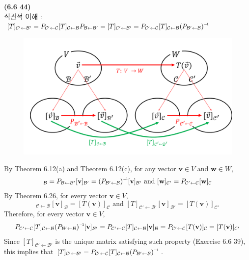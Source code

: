 \textbf{(6.6 44)} \\
직관적 이해 : $[T]_{ \mathcal{C}' \leftarrow \mathcal{B}' } = P_{ \mathcal{C}' \leftarrow \mathcal{C} }[T]_{ \mathcal{C} \leftarrow \mathcal{B} }P_{ \mathcal{B} \leftarrow \mathcal{B}' } = [T]_{ \mathcal{C}' \leftarrow \mathcal{B}' } = P_{ \mathcal{C}' \leftarrow \mathcal{C} }[T]_{ \mathcal{C} \leftarrow \mathcal{B} }\inv{(P_{ \mathcal{B}' \leftarrow \mathcal{B}}) }$
\begin{figure}[H]
	\begin{center}
		\includegraphics[scale = 0.4]{Figure3.pdf}
	\end{center}
\end{figure} By Theorem 6.12(a) and Theorem 6.12(c), for any vector $\textbf{v} \in V$ and $\textbf{w} \in W$, \begin{align*}
	[\textbf{v}]_{\mathcal{B}} = P_{\mathcal{B} \leftarrow \mathcal{B}'}[\textbf{v}]_{\mathcal{B}'} = \inv{( P_{\mathcal{B}' \leftarrow \mathcal{B}} )}[\textbf{v}]_{\mathcal{B}'}  \mbox{ and } [\textbf{w}]_{\mathcal{C}'} = P_{\mathcal{C}' \leftarrow \mathcal{C}}[\textbf{w}]_\mathcal{C}
\end{align*}
By Theorem 6.26, for every vector $\textbf{v} \in V$, \begin{equation*}
	[T]_{ \mathcal{C} \leftarrow \mathcal{B} }[\textbf{v}]_\mathcal{B} = [T(\textbf{v})]_\mathcal{C} \mbox{ and } [T]_{ \mathcal{C}' \leftarrow \mathcal{B}' }[\textbf{v}]_{\mathcal{B}'} = [T(\textbf{v})]_{\mathcal{C}'}
\end{equation*}
Therefore, for every vector $\textbf{v} \in V$, \begin{align*}
	P_{ \mathcal{C}' \leftarrow \mathcal{C} }[T]_{ \mathcal{C} \leftarrow \mathcal{B} }\inv{(P_{ \mathcal{B}' \leftarrow \mathcal{B}}) }[\textbf{v}]_{\mathcal{B}'} = P_{ \mathcal{C}' \leftarrow \mathcal{C} }[T]_{ \mathcal{C} \leftarrow \mathcal{B} }[\textbf{v}]_\mathcal{B} = P_{ \mathcal{C}' \leftarrow \mathcal{C} }[T(\textbf{v})]_\mathcal{C} = [T(\textbf{v})]_{\mathcal{C}'}
\end{align*}
Since $[T]_{ \mathcal{C}' \leftarrow \mathcal{B}' }$ is the unique matrix satisfying such property (Exercise 6.6 39), this implies that $[T]_{ \mathcal{C}' \leftarrow \mathcal{B}' } = P_{ \mathcal{C}' \leftarrow \mathcal{C} }[T]_{ \mathcal{C} \leftarrow \mathcal{B} }\inv{(P_{ \mathcal{B}' \leftarrow \mathcal{B}}) }$. \\

